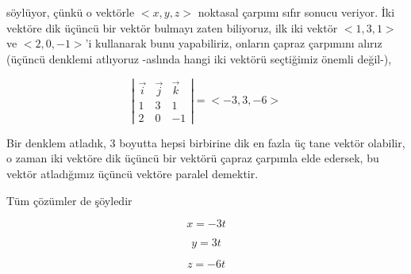 \documentclass[12pt,fleqn]{article}\usepackage{../../common}
\begin{document}
söylüyor, çünkü o vektörle $< x,y,z >$ noktasal çarpımı sıfır sonucu veriyor. İki
vektöre dik üçüncü bir vektör bulmayı zaten biliyoruz, ilk iki vektör $< 1,3,1 >$
ve $< 2,0,-1 >$'i kullanarak bunu yapabiliriz, onların çapraz çarpımını
alırız (üçüncü denklemi atlıyoruz -aslında hangi iki vektörü seçtiğimiz önemli
değil-),

$$ 
\left|\begin{array}{rrr}
\vec{i} & \vec{j} & \vec{k}  \\
1 & 3 & 1 \\
2 & 0 & -1
\end{array}\right| = < -3,3,-6 >
$$

Bir denklem atladık, 3 boyutta hepsi birbirine dik en fazla üç tane vektör
olabilir, o zaman iki vektöre dik üçüncü bir vektörü çapraz çarpımla elde
edersek, bu vektör atladığımız üçüncü vektöre paralel demektir.

Tüm çözümler de şöyledir

$$ x = -3t $$

$$ y = 3t $$

$$ z = -6t $$
\end{document}
